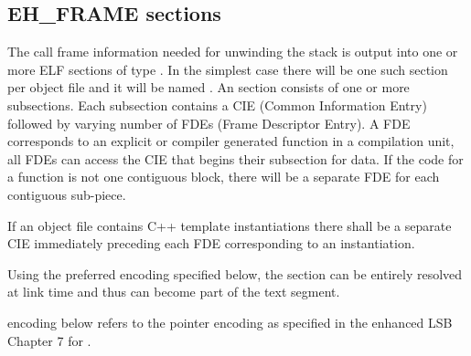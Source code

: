 \subsection{EH\_FRAME sections}
\label{sec_eh_frame}

The call frame information needed for unwinding the stack is output into
one or more ELF sections of type . In the simplest
case there
will be one such section per object file and it will be named
.  An  section consists of one or more
subsections. Each subsection contains a CIE (Common Information Entry)
followed by varying number of FDEs (Frame Descriptor Entry). A FDE
corresponds to an explicit or compiler generated function in a
compilation unit, all FDEs can access the CIE that begins their
subsection for data.  If the code for a function is not one contiguous
block, there will be a separate FDE for each contiguous sub-piece.

If an object file contains C++ template instantiations there shall be
a separate CIE immediately preceding each FDE corresponding to an
instantiation.

Using the preferred encoding specified below, the  section can
be entirely resolved at link time and thus can become part of the
text segment.

 encoding below refers to the pointer encoding as specified in the
enhanced LSB Chapter 7 for .

